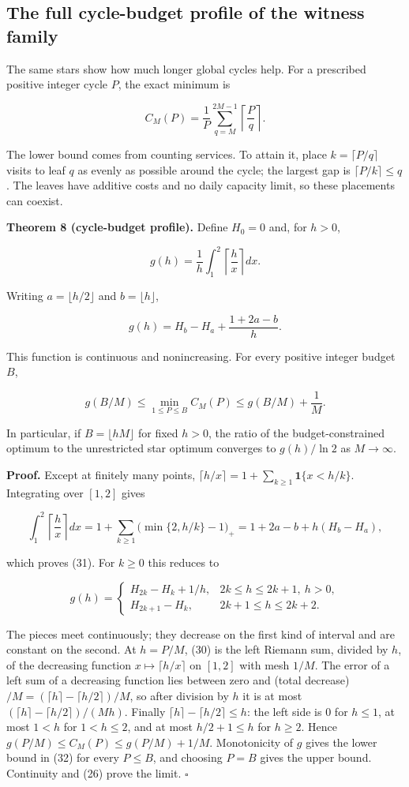 \documentclass[
  british,
  11pt,
  a4paper,
]{article}
\begin{document}
\subsection{The full cycle-budget profile of the witness
family}\label{the-full-cycle-budget-profile-of-the-witness-family}

The same stars show how much longer global cycles help. For a prescribed
positive integer cycle \(P\), the exact minimum is

\[
C_M(P)=\frac1P\sum_{q=M}^{2M-1}\left\lceil\frac Pq\right\rceil. \tag{30}
\]

The lower bound comes from counting services. To attain it, place
\(k=\lceil P/q\rceil\) visits to leaf \(q\) as evenly as possible around
the cycle; the largest gap is \(\lceil P/k\rceil\le q\). The leaves have
additive costs and no daily capacity limit, so these placements can
coexist.

\textbf{Theorem 8 (cycle-budget profile).} Define \(H_0=0\) and, for
\(h>0\),

\[
g(h)=\frac1h\int_1^2\left\lceil\frac h x\right\rceil dx.
\]

Writing \(a=\lfloor h/2\rfloor\) and \(b=\lfloor h\rfloor\),

\[
g(h)=H_b-H_a+\frac{1+2a-b}{h}. \tag{31}
\]

This function is continuous and nonincreasing. For every positive
integer budget \(B\),

\[
g(B/M)\le\min_{1\le P\le B}C_M(P)
\le g(B/M)+\frac1M. \tag{32}
\]

In particular, if \(B=\lfloor hM\rfloor\) for fixed \(h>0\), the ratio
of the budget-constrained optimum to the unrestricted star optimum
converges to \(g(h)/\ln2\) as \(M\to\infty\).

\textbf{Proof.} Except at finitely many points,
\(\lceil h/x\rceil=1+\sum_{k\ge1}\mathbf1\{x<h/k\}\). Integrating over
\([1,2]\) gives

\[
\int_1^2\left\lceil\frac h x\right\rceil dx
=1+\sum_{k\ge1}\bigl(\min\{2,h/k\}-1\bigr)_+
=1+2a-b+h(H_b-H_a),
\]

which proves (31). For \(k\ge0\) this reduces to

\[
g(h)=
\begin{cases}
H_{2k}-H_k+1/h,&2k\le h\le2k+1,\ h>0,\\
H_{2k+1}-H_k,&2k+1\le h\le2k+2.
\end{cases}
\]

The pieces meet continuously; they decrease on the first kind of
interval and are constant on the second. At \(h=P/M\), (30) is the left
Riemann sum, divided by \(h\), of the decreasing function
\(x\mapsto\lceil h/x\rceil\) on \([1,2]\) with mesh \(1/M\). The error
of a left sum of a decreasing function lies between zero and (total
decrease)\(/M=(\lceil h\rceil-\lceil h/2\rceil)/M\), so after division
by \(h\) it is at most \((\lceil h\rceil-\lceil h/2\rceil)/(Mh)\).
Finally \(\lceil h\rceil-\lceil h/2\rceil\le h\): the left side is \(0\)
for \(h\le1\), at most \(1<h\) for \(1<h\le2\), and at most
\(h/2+1\le h\) for \(h\ge2\). Hence \(g(P/M)\le C_M(P)\le g(P/M)+1/M\).
Monotonicity of \(g\) gives the lower bound in (32) for every
\(P\le B\), and choosing \(P=B\) gives the upper bound. Continuity and
(26) prove the limit. \(\square\)
\end{document}
